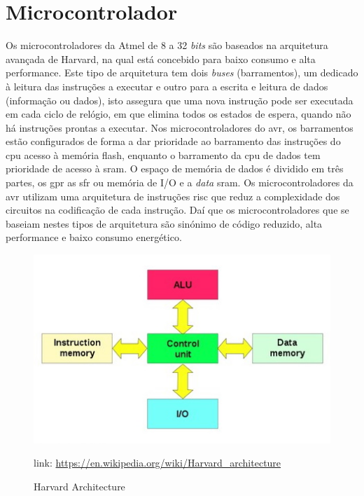 \section{Microcontrolador}
Os microcontroladores da Atmel de 8 a 32 \textit{bits} são baseados na arquitetura avançada de Harvard, na qual está concebido para baixo consumo e alta performance.
\emptyline
Este tipo de arquitetura tem dois \textit{buses} (barramentos), um dedicado à leitura das instruções a executar e outro para a escrita e leitura de dados (informação ou dados), isto assegura que uma nova instrução pode ser executada em cada ciclo de relógio, em que elimina todos os estados de espera, quando não há instruções prontas a executar.
\emptyline
Nos microcontroladores do \ac{avr}, os barramentos estão configurados de forma a dar prioridade ao barramento das instruções do \ac{cpu} acesso à memória flash, enquanto o barramento da \acs{cpu} de dados tem prioridade de acesso à \ac{sram}.
\emptyline
O espaço de memória de dados é dividido em três partes, os \ac{gpr} as \ac{sfr} ou memória de I/O e a \textit{data} \acs{sram}.
\emptyline
Os microcontroladores da \acs{avr} utilizam uma arquitetura de instruções \ac{risc} que reduz a complexidade dos circuitos na codificação de cada instrução. Daí que os microcontroladores que se baseiam nestes tipos de arquitetura são sinónimo de código reduzido, alta performance e baixo consumo energético.\\
\begin{figure}[H]
	\centering
	\includegraphics[scale=.75]{./image/PESTA/Diagrama/Harvard_architecture.jpg}
	\caption{Harvard Architecture}
	\label{Harvard_architecture}
	\vspace{.1cm}
	\qquad link: \url{https://en.wikipedia.org/wiki/Harvard_architecture}
\end{figure}
